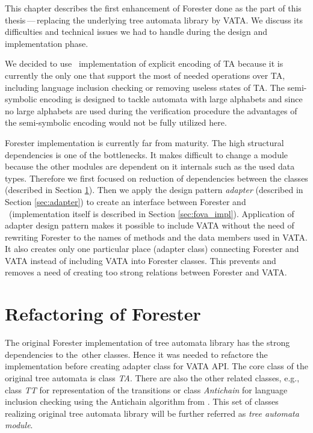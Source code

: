 This chapter describes the first enhancement of Forester done as the part of this thesis\,---\,replacing
the underlying tree automata library by VATA.
We discuss its difficulties and technical issues we had to handle during
the design and implementation phase.

We decided to use \vata\ implementation of explicit encoding of TA because
it is currently the only one that support the most of needed operations over TA,
including language inclusion checking or removing useless states of TA.
The semi-symbolic encoding is designed to tackle automata
with large alphabets
and since no large alphabets are used during the verification procedure
the advantages of the semi-symbolic encoding would not be fully utilized here.

Forester implementation is currently far from maturity.
The high structural dependencies is one of the bottlenecks.
It makes difficult to change a module because the other modules are
dependent on it internals such as the used data types.
Therefore we first focused on reduction of dependencies between the classes (described in Section \ref{sec:forester_prep}).
Then we apply the design pattern \emph{adapter} \cite{gamma95} (described in Section \ref{sec:adapter}) to create
an interface between Forester and \vata\ (implementation itself is described in Section \ref{sec:fova_impl}).
Application of adapter design pattern makes it possible to include VATA without the need of rewriting
Forester to the names of methods and the data members used in VATA.
It also creates only one particular place (adapter class) connecting Forester and VATA instead of
including VATA into Forester classes.
This prevents and removes a need of creating too strong relations between Forester and VATA.

\section{Refactoring of Forester}
\label{sec:forester_prep}

The original Forester implementation of tree automata library
has the strong dependencies to the~other classes.
Hence it was needed to refactore the implementation
before creating adapter class for VATA API.
The core class of the original tree automata is class \emph{TA}.
There are also the other related classes, e.g.,
class \emph{TT} for representation of the transitions
or class \emph{Antichain} for language inclusion checking
using the Antichain algorithm from \cite{tacas10}.
This set of classes realizing original tree automata library will be further referred as \emph{tree automata module}.

